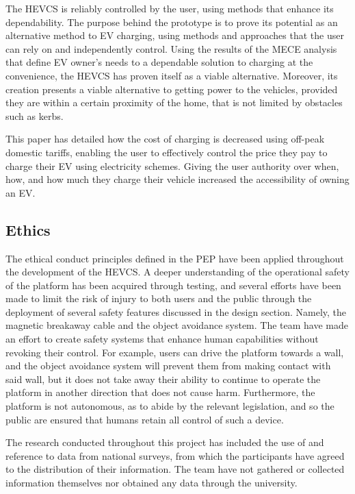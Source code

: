 \documentclass [12pt]{article}
\begin{document}
The HEVCS is reliably controlled by the user, using methods that enhance its dependability. The purpose behind the prototype is to prove its potential as an alternative method to EV charging, using methods and approaches that the user can rely on and independently control. Using the results of the MECE analysis that define EV owner’s needs to a dependable solution to charging at the convenience, the HEVCS has proven itself as a viable alternative. Moreover, its creation presents a viable alternative to getting power to the vehicles, provided they are within a certain proximity of the home, that is not limited by obstacles such as kerbs.   

This paper has detailed how the cost of charging is decreased using off-peak domestic tariffs, enabling the user to effectively control the price they pay to charge their EV using electricity schemes. Giving the user authority over when, how, and how much they charge their vehicle increased the accessibility of owning an EV.  

\subsection{Ethics}

The ethical conduct principles defined in the PEP have been applied throughout the development of the HEVCS. A deeper understanding of the operational safety of the platform has been acquired through testing, and several efforts have been made to limit the risk of injury to both users and the public through the deployment of several safety features discussed in the design section. Namely, the magnetic breakaway cable and the object avoidance system. The team have made an effort to create safety systems that enhance human capabilities without revoking their control. For example, users can drive the platform towards a wall, and the object avoidance system will prevent them from making contact with said wall, but it does not take away their ability to continue to operate the platform in another direction that does not cause harm. Furthermore, the platform is not autonomous, as to abide by the relevant legislation, and so the public are ensured that humans retain all control of such a device.  

The research conducted throughout this project has included the use of and reference to data from national surveys, from which the participants have agreed to the distribution of their information. The team have not gathered or collected information themselves nor obtained any data through the university.   
\end{document}
